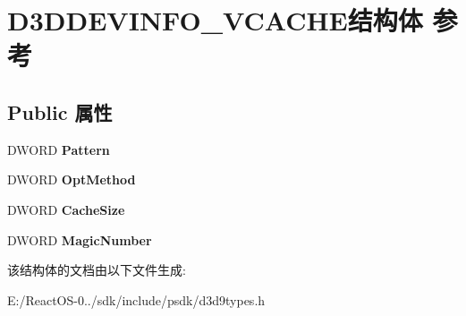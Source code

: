 \hypertarget{struct_d3_d_d_e_v_i_n_f_o___v_c_a_c_h_e}{}\section{D3\+D\+D\+E\+V\+I\+N\+F\+O\+\_\+\+V\+C\+A\+C\+H\+E结构体 参考}
\label{struct_d3_d_d_e_v_i_n_f_o___v_c_a_c_h_e}
\subsection*{Public 属性}
\begin{DoxyCompactItemize}
\item 
\mbox{\label{struct_d3_d_d_e_v_i_n_f_o___v_c_a_c_h_e_a39c429cb18f6325763c55b13fd1d3ccc}} 
D\+W\+O\+RD {\bfseries Pattern}
\item 
\mbox{\label{struct_d3_d_d_e_v_i_n_f_o___v_c_a_c_h_e_a136b6057201efb48e36b1dbd06b7f36b}} 
D\+W\+O\+RD {\bfseries Opt\+Method}
\item 
\mbox{\label{struct_d3_d_d_e_v_i_n_f_o___v_c_a_c_h_e_a7070121e820dfceb463e764437e2ccec}} 
D\+W\+O\+RD {\bfseries Cache\+Size}
\item 
\mbox{\label{struct_d3_d_d_e_v_i_n_f_o___v_c_a_c_h_e_a476525cb67afbcc5cc9998a2f4c137a6}} 
D\+W\+O\+RD {\bfseries Magic\+Number}
\end{DoxyCompactItemize}


该结构体的文档由以下文件生成\+:\begin{DoxyCompactItemize}
\item 
E\+:/\+React\+O\+S-\/0../sdk/include/psdk/d3d9types.\+h\end{DoxyCompactItemize}
